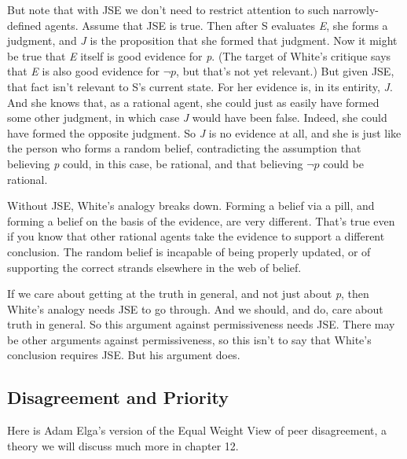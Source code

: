 But note that with JSE we don't need to restrict attention to such narrowly-defined agents. Assume that JSE is true. Then after S evaluates \emph{E}, she forms a judgment, and \emph{J} is the proposition that she formed that judgment. Now it might be true that \emph{E} itself is good evidence for \emph{p}. (The target of White's critique says that \emph{E} is also good evidence for $\neg p$, but that's not yet relevant.) But given JSE, that fact isn't relevant to S's current state. For her evidence is, in its entirity, \emph{J}. And she knows that, as a rational agent, she could just as easily have formed some other judgment, in which case \emph{J} would have been false. Indeed, she could have formed the opposite judgment. So \emph{J} is no evidence at all, and she is just like the person who forms a random belief, contradicting the assumption that believing \emph{p} could, in this case, be rational, and that believing $\neg p$ could be rational.

Without JSE, White's analogy breaks down. Forming a belief via a pill, and forming a belief on the basis of the evidence, are very different. That's true even if you know that other rational agents take the evidence to support a different conclusion. The random belief is incapable of being properly updated, or of supporting the correct strands elsewhere in the web of belief.

If we care about getting at the truth in general, and not just about \emph{p}, then White's analogy needs JSE to go through. And we should, and do, care about truth in general. So this argument against permissiveness needs JSE. There may be other arguments against permissiveness, so this isn't to say that White's conclusion requires JSE. But his argument does.

\subsection{Disagreement and Priority}
\label{disagreementandpriority}

Here is Adam Elga's version of the Equal Weight View of peer disagreement, a theory we will discuss much more in chapter 12.


